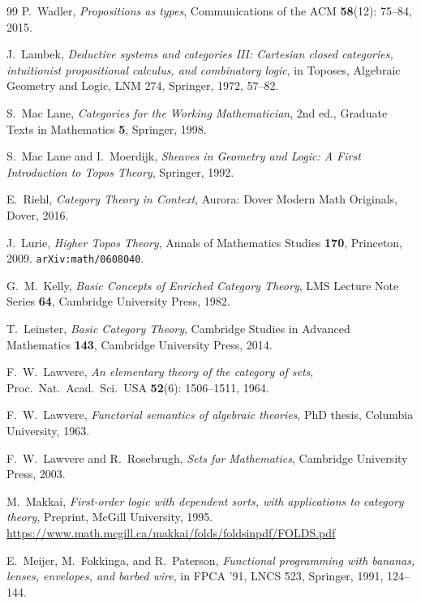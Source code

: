 \documentclass[12pt]{article}
\theoremstyle{definition}
\theoremstyle{remark}
\begin{document}
\begin{thebibliography}{99}
P.~Wadler,
\emph{Propositions as types},
Communications of the ACM \textbf{58}(12): 75--84, 2015.

J.~Lambek,
\emph{Deductive systems and categories III: Cartesian closed categories,
intuitionist propositional calculus, and combinatory logic},
in Toposes, Algebraic Geometry and Logic, LNM 274, Springer, 1972, 57--82.


S.~Mac Lane,
\emph{Categories for the Working Mathematician},
2nd ed., Graduate Texts in Mathematics \textbf{5}, Springer, 1998.

S.~Mac Lane and I.~Moerdijk,
\emph{Sheaves in Geometry and Logic: A First Introduction to Topos Theory},
Springer, 1992.

E.~Riehl,
\emph{Category Theory in Context},
Aurora: Dover Modern Math Originals, Dover, 2016.

J.~Lurie,
\emph{Higher Topos Theory},
Annals of Mathematics Studies \textbf{170}, Princeton, 2009.
\texttt{arXiv:math/0608040}.

G.~M.~Kelly,
\emph{Basic Concepts of Enriched Category Theory},
LMS Lecture Note Series \textbf{64}, Cambridge University Press, 1982.

T.~Leinster,
\emph{Basic Category Theory},
Cambridge Studies in Advanced Mathematics \textbf{143}, Cambridge University Press, 2014.

F.~W.~Lawvere,
\emph{An elementary theory of the category of sets},
Proc.\ Nat.\ Acad.\ Sci.\ USA \textbf{52}(6): 1506--1511, 1964.

F.~W.~Lawvere,
\emph{Functorial semantics of algebraic theories},
PhD thesis, Columbia University, 1963.

F.~W.~Lawvere and R.~Rosebrugh,
\emph{Sets for Mathematics},
Cambridge University Press, 2003.

M.~Makkai,
\emph{First-order logic with dependent sorts, with applications to category theory},
Preprint, McGill University, 1995.
\url{https://www.math.mcgill.ca/makkai/folds/foldsinpdf/FOLDS.pdf}

E.~Meijer, M.~Fokkinga, and R.~Paterson,
\emph{Functional programming with bananas, lenses, envelopes, and barbed wire},
in FPCA '91, LNCS 523, Springer, 1991, 124--144.


\end{thebibliography}
\end{document}
